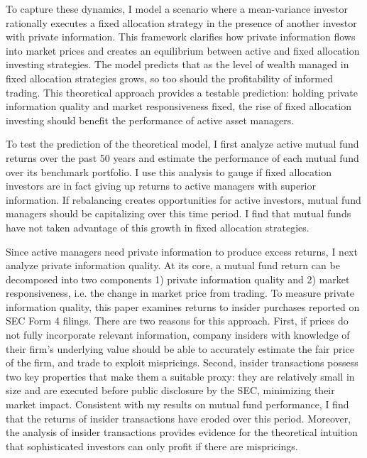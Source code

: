 \documentclass[12pt]{article}
\begin{document}
\par To capture these dynamics, I model a scenario where a mean-variance investor rationally executes a fixed allocation strategy in the presence of another investor with private information. This framework clarifies how private information flows into market prices and creates an equilibrium between active and fixed allocation investing strategies. The model predicts that as the level of wealth managed in fixed allocation strategies grows, so too should the profitability of informed trading. This theoretical approach provides a testable prediction: holding private information quality and market responsiveness fixed, the rise of fixed allocation investing should benefit the performance of active asset managers.

\par To test the prediction of the theoretical model, I first analyze active mutual fund returns over the past 50 years and estimate the performance of each mutual fund over its benchmark portfolio. I use this analysis to gauge if fixed allocation investors are in fact giving up returns to active managers with superior information. If rebalancing creates opportunities for active investors, mutual fund managers should be capitalizing over this time period. I find that mutual funds have not taken advantage of this growth in fixed allocation strategies.

\par Since active managers need private information to produce excess returns, I next analyze private information quality. At its core, a mutual fund return can be decomposed into two components 1) private information quality and 2) market responsiveness, i.e. the change in market price from trading. To measure private information quality, this paper examines returns to insider purchases reported on SEC Form 4 filings. There are two reasons for this approach. First, if prices do not fully incorporate relevant information, company insiders with knowledge of their firm's underlying value should be able to accurately estimate the fair price of the firm, and trade to exploit mispricings. Second, insider transactions possess two key properties that make them a suitable proxy: they are relatively small in size and are executed before public disclosure by the SEC, minimizing their market impact. Consistent with my results on mutual fund performance, I find that the returns of insider transactions have eroded over this period. Moreover, the analysis of insider transactions provides evidence for the theoretical intuition that sophisticated investors can only profit if there are mispricings. 
\end{document}
